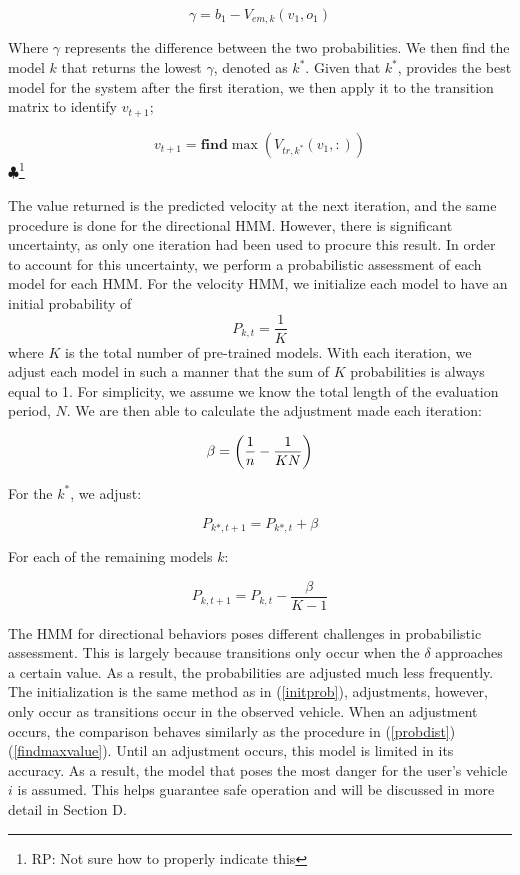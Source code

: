 \documentclass[conference]{IEEEtran}
\newcommand\RP[1]{$\clubsuit$\footnote{RP: #1}}
\begin{document}
\begin{equation} \label{probdist}
   \gamma =  b_{1} - V_{em,k}(v_{1},o_{1})
\end{equation}

Where $\gamma$ represents the difference between the two probabilities. We then find the model $k$ that returns the lowest $\gamma$, denoted as $k^{*}$. Given that $k^{*}$, provides the best model for the system after the first iteration, we then apply it to the transition matrix to identify $v_{t+1}$;

\begin{equation} \label{findmaxvalue}
    v_{t+1} = \mathbf{find}\max(V_{tr,k^{*}}(v_{1},:))
\end{equation}   \RP{Not sure how to properly indicate this}

The value returned is the predicted velocity at the next iteration, and the same procedure is done for the directional HMM. However, there is significant uncertainty, as only one iteration had been used to procure this result. In order to account for this uncertainty, we perform a probabilistic assessment of each model for each HMM. For the velocity HMM, we initialize each model to have an initial probability of 
\begin{equation} \label{initprob}
    P_{k,t} = \frac{1}{K}    
\end{equation}
where $K$ is the total number of pre-trained models. With each iteration, we adjust each model in such a manner that the sum of $K$ probabilities is always equal to 1. For simplicity, we assume we know the total length of the evaluation period, $N$. We are then able to calculate the adjustment made each iteration:

\begin{equation}
    \beta = \bigg{(}\frac{1}{n}-\frac{1}{KN}\bigg{)}
\end{equation}

For the $k^{*}$, we adjust:

\begin{equation} \label{optprobadj}
    P_{k*,t+1} = P_{k*,t} + \beta
\end{equation}

For each of the remaining models $k$:

\begin{equation} \label{kprobadj}
    P_{k,t+1} = P_{k,t} - \frac{\beta}{K-1}
\end{equation}

The HMM for directional behaviors poses different challenges in probabilistic assessment. This is largely because transitions only occur when the $\delta$ approaches a certain value. As a result, the probabilities are adjusted much less frequently. The initialization is the same method as in (\ref{initprob}), adjustments, however, only occur as transitions occur in the observed vehicle. When an adjustment occurs, the comparison behaves similarly as the procedure in (\ref{probdist}) (\ref{findmaxvalue}). Until an adjustment occurs, this model is limited in its accuracy. As a result, the model that poses the most danger for the user's vehicle $i$ is assumed. This helps guarantee safe operation and will be discussed in more detail in Section D.
\end{document}
